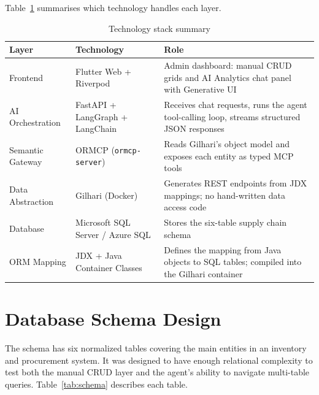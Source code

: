 \documentclass{book}
\begin{document}
Table~\ref{tab:techstack} summarises which technology handles each layer.

\begin{table}[ht]
\centering
\begin{tabular}{|p{3cm}|p{4cm}|p{7cm}|}
\hline
\textbf{Layer} & \textbf{Technology} & \textbf{Role} \\
\hline
Frontend & Flutter Web + Riverpod & Admin dashboard: manual CRUD grids and AI Analytics chat panel with Generative UI \\
\hline
AI Orchestration & FastAPI + LangGraph + LangChain & Receives chat requests, runs the agent tool-calling loop, streams structured JSON responses \\
\hline
Semantic Gateway & ORMCP (\texttt{ormcp-server}) & Reads Gilhari's object model and exposes each entity as typed MCP tools \\
\hline
Data Abstraction & Gilhari (Docker) & Generates REST endpoints from JDX mappings; no hand-written data access code \\
\hline
Database & Microsoft SQL Server / Azure SQL & Stores the six-table supply chain schema \\
\hline
ORM Mapping & JDX + Java Container Classes & Defines the mapping from Java objects to SQL tables; compiled into the Gilhari container \\
\hline
\end{tabular}
\caption{Technology stack summary}
\label{tab:techstack}
\end{table}

\section{Database Schema Design}

The schema has six normalized tables covering the main entities in an inventory and procurement system. It was designed to have enough relational complexity to test both the manual CRUD layer and the agent's ability to navigate multi-table queries. Table~\ref{tab:schema} describes each table.
\end{document}
